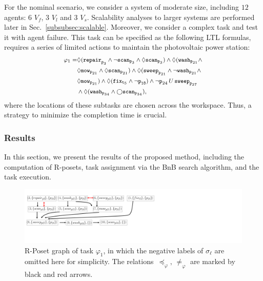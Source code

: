 For the nominal scenario, we consider a system of moderate size,
including $12$ agents: 6 $V_f$, 3 $V_l$ and 3 $V_s$.
Scalability analyses to larger systems are performed later in Sec.~\ref{subsubsec:scalable}.
Moreover, we consider a complex task and test it with agent failure.
This task can be specified as the following LTL formulas,
requires a series of limited actions to
maintain the photovoltaic power station:
\begin{equation}\footnotesize
\label{eq:task1}
  \begin{aligned}
\varphi_1 = & \Diamond(\texttt{repair}_{\texttt{p}_{3}} \wedge \lnot \texttt{scan}_{\texttt{p}_3} \wedge\Diamond \texttt{scan}_{\texttt{p}_3})
\wedge \Diamond (\texttt{wash}_{\texttt{p}_{21}} \wedge \\
&\Diamond \texttt{mow}_{\texttt{p}_{21}} \wedge \Diamond \texttt{scan}_{\texttt{p}_{21}}) \wedge \Diamond ( \texttt{sweep}_{\texttt{p}_{21}} \wedge \lnot \texttt{wash}_{\texttt{p}_{21}} \wedge\\
& \Diamond \texttt{mow}_{\texttt{p}_{21}}) \wedge \Diamond(\texttt{fix}_{\texttt{t}_5} \wedge \lnot \texttt{p}_{\texttt{18}}) \wedge \lnot \texttt{p}_{24} \,U \, \texttt{sweep}_{\texttt{p}_{27}} \\
&\wedge \Diamond (\texttt{wash}_{\texttt{p}_{34}} \wedge \bigcirc \texttt{scan}_{\texttt{p}_{34}}),
\end{aligned}
\end{equation}
where the locations of these subtasks are chosen across the workspace.
Thus, a strategy to minimize the completion time is crucial.

\subsubsection{Results}\label{subsubsec:results}
In this section, we present the results of the proposed method, including the computation of R-posets,
task assignment via the BnB search algorithm, and the task execution.

\begin{figure}[t!]
		\centering%
		\includegraphics[height = 0.12 \textwidth]{figures/simulation/taskfinal/ipe_poset_graph.pdf}
	\caption{R-Poset graph of task $\varphi_1$, in which the negative labels of $\sigma_\ell$ are omitted here for simplicity.
          The relations~$\preceq_\varphi,\, \neq_{\varphi}$ are marked
          by black and red arrows.}
       \label{fig:task12-posets}
\end{figure}

